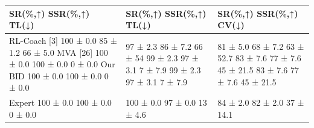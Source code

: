 \begin{tabular}{lll}
\toprule
SR(\%,↑) SSR(\%,↑) TL(↓) & SR(\%,↑) SSR(\%,↑) TL(↓) & SR(\%,↑) SSR(\%,↑) CV(↓) \\
\midrule
RL-Coach [3] 100 ± 0.0 85 ± 1.2 66 ± 5.0 MVA [26] 100 ± 0.0 100 ± 0.0 0 ± 0.0 Our BID 100 ± 0.0 100 ± 0.0 0 ± 0.0 & 97 ± 2.3 86 ± 7.2 66 ± 54 99 ± 2.3 97 ± 3.1 7 ± 7.9 99 ± 2.3 97 ± 3.1 7 ± 7.9 & 81 ± 5.0 68 ± 7.2 63 ± 52.7 83 ± 7.6 77 ± 7.6 45 ± 21.5 83 ± 7.6 77 ± 7.6 45 ± 21.5 \\
Expert 100 ± 0.0 100 ± 0.0 0 ± 0.0 & 100 ± 0.0 97 ± 0.0 13 ± 4.6 & 84 ± 2.0 82 ± 2.0 37 ± 14.1 \\
\bottomrule
\end{tabular}
